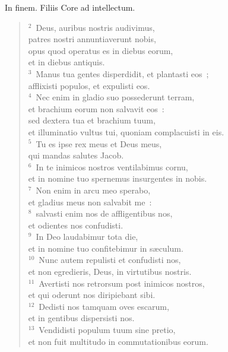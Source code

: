 \lettrine[lines=3,image=true,loversize=0.05,lraise=-0.03]{I}{}n finem. Filiis Core ad intellectum.
\begin{flushleft}\begin{verse}\vspace{6pt}${}^{2}$~Deus, auribus nostris audivimus,\\ patres nostri annuntiaverunt nobis,\\ opus quod operatus es in diebus eorum,\\ et in diebus antiquis.\\
${}^{3}$~Manus tua gentes disperdidit, et plantasti eos~;\\ afflixisti populos, et expulisti eos.\\
${}^{4}$~Nec enim in gladio suo possederunt terram,\\ et brachium eorum non salvavit eos~:\\ sed dextera tua et brachium tuum,\\ et illuminatio vultus tui, quoniam complacuisti in eis.\\
${}^{5}$~Tu es ipse rex meus et Deus meus,\\ qui mandas salutes Jacob.\\
${}^{6}$~In te inimicos nostros ventilabimus cornu,\\ et in nomine tuo spernemus insurgentes in nobis.\\
${}^{7}$~Non enim in arcu meo sperabo,\\ et gladius meus non salvabit me~:\\
${}^{8}$~salvasti enim nos de affligentibus nos,\\ et odientes nos confudisti.\\
${}^{9}$~In Deo laudabimur tota die,\\ et in nomine tuo confitebimur in s\ae culum.\\
${}^{10}$~Nunc autem repulisti et confudisti nos,\\ et non egredieris, Deus, in virtutibus nostris.\\
${}^{11}$~Avertisti nos retrorsum post inimicos nostros,\\ et qui oderunt nos diripiebant sibi.\\
${}^{12}$~Dedisti nos tamquam oves escarum,\\ et in gentibus dispersisti nos.\\
${}^{13}$~Vendidisti populum tuum sine pretio,\\ et non fuit multitudo in commutationibus eorum.\\

\end{verse}
\end{flushleft}
